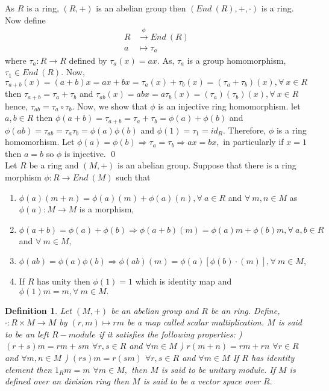 \documentclass[11pt]{amsart}
\newtheorem{definition}[theorem]{Definition}%
\begin{document}
\proof As $R$ is a ring, $(R,+)$ is an abelian group then $(End~(R),+,\cdot)$ is a ring. Now define \begin{align*}
R&\stackrel{\phi}{\longrightarrow}End~(R)\\
a&\mapsto \tau_a
\end{align*}
where $\tau_a:R\to R$ defined by $\tau_a(x)=ax$. As, $\tau_a$ is a group homomorphism, $\tau_1\in End~(R).$ Now, $\tau_{a+b}(x)=(a+b)x=ax+bx=\tau_a(x)+\tau_b(x)=(\tau_a+\tau_b)(x),\forall~x\in R$ then $\tau_{a+b}=\tau_a+\tau_b$ and $\tau_{ab}(x)=abx=a\tau_b(x)=(\tau_a)(\tau_b)(x),\forall~x\in R$ hence, $\tau_{ab}=\tau_a\circ \tau_b.$ Now, we show that $\phi$ is an injective ring homomorphism. let $a,b\in R$ then $\phi(a+b)=\tau_{a+b}=\tau_a+\tau_b=\phi(a)+\phi(b)$ and $\phi(ab)=\tau_{ab}=\tau_a\tau_b=\phi(a)\phi(b)$ and $\phi(1)=\tau_1=id_R$. Therefore, $\phi$ is a ring homomorhism. Let $\phi(a)=\phi(b) \Rightarrow \tau_a=\tau_b\Rightarrow ax=bx,$ in particularly if $x=1$ then $a=b$ so $\phi$ is injective. \qed\\
Let $R$ be a ring and $(M,+)$ is an abelian group. Suppose that there is a ring morphism $\phi:R\to End~(M)$ such that \begin{enumerate}
\item $\phi(a)(m+n)=\phi(a)(m)+\phi(a)(n),\forall~a\in R$ and $\forall~m,n\in M$ as $\phi(a):M\to M$ is a morphism,
\item $\phi(a+b)=\phi(a)+\phi(b) \Rightarrow \phi(a+b)(m)=\phi(a)m+\phi(b)m,\forall~ a,b\in R$ and $\forall~m\in M,$
\item $\phi(ab)=\phi(a)\phi(b) \Rightarrow \phi(ab)(m)=\phi(a)[\phi(b)\cdot (m)],\forall~m\in M$,
\item If $R$ has unity then $\phi(1)=1$ which is identity map and $\phi(1)m=m,\forall~m\in M.$
\end{enumerate}







\begin{definition}
Let $(M,+)$ be an abelian group and $R$ be an ring. Define, $\cdot : R\times M \rightarrow M$ by $(r,m)\mapsto rm$ be a map called scalar multiplication. $M$ is said to be an left $R-module$ if it satisfies the following properties:
) $(r+s)m=rm+sm$ $\forall r,s\in R$ and $\forall m\in M$
) $r(m+n)=rm+rn$ $\forall r\in R$ and $\forall m,n \in M$
) $(rs)m=r(sm)$ $\forall r,s\in R$ and $\forall m\in M$
\newline If $R$ has identity element then $1_{R}m=m$ $\forall m\in M,$ then $M$ is said to be unitary module. 
If $M$ is defined over an division ring then $M$ is said to be a vector space over $R.$
\end{definition}
\end{document}
